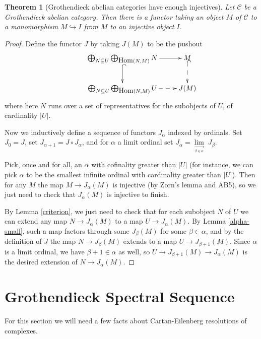 \documentclass[letterpaper,11pt]{article}
\newtheorem{thm}{Theorem}
\theoremstyle{definition}
\theoremstyle{remark}
\begin{document}
\begin{thm}[Grothendieck abelian categories have enough injectives]\label{injectives} Let $\mathcal{C}$ be a Grothendieck abelian category. Then there is a functor taking an object $M$ of $\mathcal{C}$ to a monomorphism $M\hookrightarrow I$ from $M$ to an injective object $I$.
\end{thm}
\begin{proof} Define the functor $J$ by taking $J(M)$ to be the pushout
\begin{align*}
\xymatrix{&\bigoplus_{N\subseteq U}\bigoplus_{\mbox{Hom}(N,M)}N \ar[r] \ar@{^{(}->}[d] & M \ar@{^{(}-->}[d]\\
&\bigoplus_{N\subseteq U}\bigoplus_{\mbox{Hom}(N,M)}U \ar@{-->}[r] & J(M)}
\end{align*}
where here $N$ runs over a set of representatives for the subobjects of $U$, of cardinality $|U|$.

Now we inductively define a sequence of functors $J_\alpha$ indexed by ordinals. Set $J_0 = J$, set $J_{\alpha+1} = J\circ J_\alpha$, and for $\alpha$ a limit ordinal set $J_\alpha = \underset{\underset{\beta\in\alpha}{\longrightarrow}}{\lim}\;J_\beta$.

Pick, once and for all, an $\alpha$ with cofinality greater than $|U|$ (for instance, we can pick $\alpha$ to be the smallest infinite ordinal with cardinality greater than $|U|$). Then for any $M$ the map $M\rightarrow J_\alpha(M)$ is injective (by Zorn's lemma and AB5), so we just need to check that $J_\alpha(M)$ is injective to finish.

By Lemma \ref{criterion}, we just need to check that for each subobject $N$ of $U$ we can extend any map $N\rightarrow J_\alpha(M)$ to a map $U\rightarrow J_\alpha(M)$. By Lemma \ref{alpha-small}, such a map factors through some $J_\beta(M)$ for some $\beta\in\alpha$, and by the definition of $J$ the map $N\rightarrow J_\beta(M)$ extends to a map $U\rightarrow J_{\beta+1}(M)$. Since $\alpha$ is a limit ordinal, we have $\beta+1\in \alpha$ as well, so $U\rightarrow J_{\beta+1}(M)\rightarrow J_{\alpha}(M)$ is the desired extension of $N\rightarrow J_\alpha(M)$.
\end{proof}

\section{Grothendieck Spectral Sequence}

For this section we will need a few facts about Cartan-Eilenberg resolutions of complexes.
\end{document}
